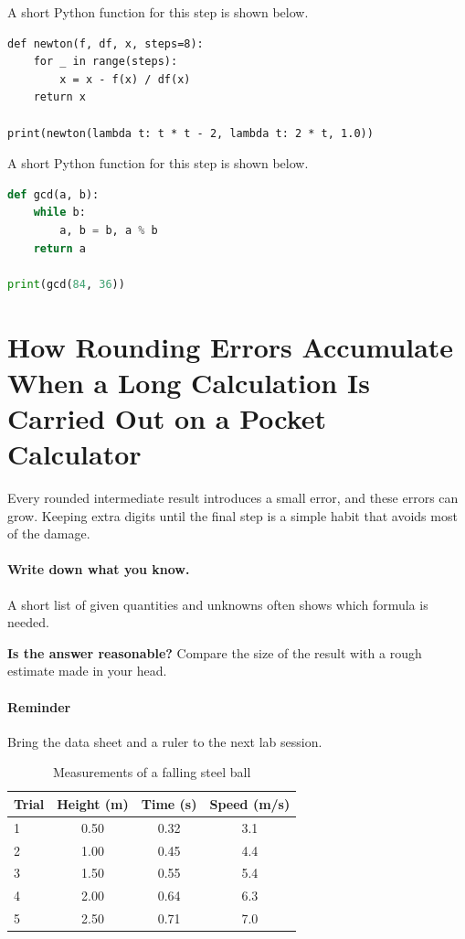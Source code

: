 \documentclass[11pt]{article}
\begin{document}
A short Python function for this step is shown below.

{\small\begin{verbatim}
def newton(f, df, x, steps=8):
    for _ in range(steps):
        x = x - f(x) / df(x)
    return x

print(newton(lambda t: t * t - 2, lambda t: 2 * t, 1.0))
\end{verbatim}}

A short Python function for this step is shown below.

\begin{lstlisting}[language=Python]
def gcd(a, b):
    while b:
        a, b = b, a % b
    return a

print(gcd(84, 36))
\end{lstlisting}

\section{How Rounding Errors Accumulate When a Long Calculation Is Carried Out on a Pocket Calculator}

Every rounded intermediate result introduces a small error, and these errors can grow. Keeping extra digits until the final step is a simple habit that avoids most of the damage.

\paragraph{Write down what you know.} A short list of given quantities and unknowns often shows which formula is needed.

\textbf{Is the answer reasonable?} Compare the size of the result with a rough estimate made in your head.

\paragraph{Reminder} Bring the data sheet and a ruler to the next lab session.

\begin{table}[H]
\centering
\caption{Measurements of a falling steel ball}
\begin{tabular}{lccc}
\toprule
\textbf{Trial} & \textbf{Height (m)} & \textbf{Time (s)} & \textbf{Speed (m/s)} \\
\midrule
1 & 0.50 & 0.32 & 3.1 \\
2 & 1.00 & 0.45 & 4.4 \\
3 & 1.50 & 0.55 & 5.4 \\
4 & 2.00 & 0.64 & 6.3 \\
5 & 2.50 & 0.71 & 7.0 \\
\bottomrule
\end{tabular}
\end{table}
\end{document}
